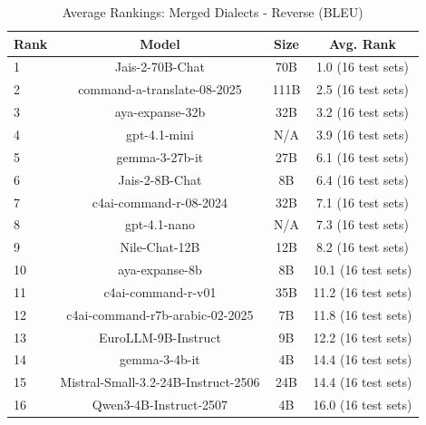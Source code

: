 \begin{table}[htbp]
\centering
\caption{Average Rankings: Merged Dialects - Reverse (BLEU)}
\label{tab:avg_rankings_bleu}
\begin{tabular}{l@{\hspace{3pt}}c@{\hspace{3pt}}c@{\hspace{3pt}}c}
\toprule
Rank & Model & Size & Avg. Rank \\
\midrule
1 & Jais-2-70B-Chat & 70B & 1.0 (16 test sets) \\
2 & command-a-translate-08-2025 & 111B & 2.5 (16 test sets) \\
3 & aya-expanse-32b & 32B & 3.2 (16 test sets) \\
4 & gpt-4.1-mini & N/A & 3.9 (16 test sets) \\
5 & gemma-3-27b-it & 27B & 6.1 (16 test sets) \\
6 & Jais-2-8B-Chat & 8B & 6.4 (16 test sets) \\
7 & c4ai-command-r-08-2024 & 32B & 7.1 (16 test sets) \\
8 & gpt-4.1-nano & N/A & 7.3 (16 test sets) \\
9 & Nile-Chat-12B & 12B & 8.2 (16 test sets) \\
10 & aya-expanse-8b & 8B & 10.1 (16 test sets) \\
11 & c4ai-command-r-v01 & 35B & 11.2 (16 test sets) \\
12 & c4ai-command-r7b-arabic-02-2025 & 7B & 11.8 (16 test sets) \\
13 & EuroLLM-9B-Instruct & 9B & 12.2 (16 test sets) \\
14 & gemma-3-4b-it & 4B & 14.4 (16 test sets) \\
15 & Mistral-Small-3.2-24B-Instruct-2506 & 24B & 14.4 (16 test sets) \\
16 & Qwen3-4B-Instruct-2507 & 4B & 16.0 (16 test sets) \\
\bottomrule
\end{tabular}
\end{table}
